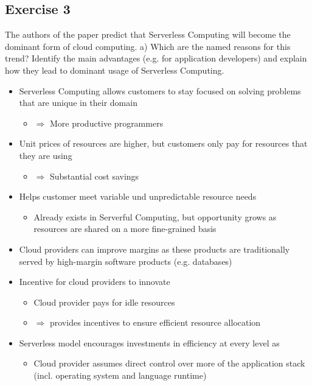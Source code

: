 \documentclass{article}
\begin{document}
\subsection{Exercise 3}
The authors of the paper predict that Serverless Computing will become the dominant form of cloud computing.
a) Which are the named reasons for this trend? Identify the main advantages (e.g. for application developers) and explain how they lead to dominant usage of Serverless Computing.
\begin{itemize}
    \item Serverless Computing allows customers to stay focused on solving problems that are unique in their domain
          \begin{itemize}
              \item \(\Rightarrow\) More productive programmers
          \end{itemize}
    \item Unit prices of resources are higher, but customers only pay for resources that they are using
          \begin{itemize}
              \item \(\Rightarrow\) Substantial cost savings
          \end{itemize}
    \item Helps customer meet variable und unpredictable resource needs
          \begin{itemize}
              \item Already exists in Serverful Computing, but opportunity grows as resources are shared on a more fine-grained basis
          \end{itemize}
    \item Cloud providers can improve margins as these products are traditionally served by high-margin software products (e.g. databases)
    \item Incentive for cloud providers to innovate
          \begin{itemize}
              \item Cloud provider pays for idle resources
              \item \(\Rightarrow\) provides incentives to ensure efficient resource allocation
          \end{itemize}
    \item Serverless model encourages investments in efficiency at every level as
          \begin{itemize}
              \item Cloud provider assumes direct control over more of the application stack (incl. operating system and language runtime)
          \end{itemize}
\end{itemize}
\end{document}
